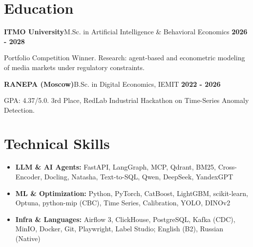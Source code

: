 \documentclass[a4paper,10pt]{article}
\newcommand{\sep}{\hspace{0.45em}\textbar\hspace{0.45em}}
\begin{document}
\section{Education}
\noindent\textbf{ITMO University}\sep M.Sc. in Artificial Intelligence \& Behavioral Economics \hfill \textbf{\color{muted}2026 - 2028}\par
\noindent Portfolio Competition Winner. Research: \mbox{agent-based} and econometric modeling of media markets under regulatory constraints.\par\vspace{3.0pt}
\noindent\textbf{RANEPA (Moscow)}\sep B.Sc. in Digital Economics, IEMIT \hfill \textbf{\color{muted}2022 - 2026}\par
\noindent GPA: 4.37/5.0. 3rd Place, RedLab Industrial Hackathon on \mbox{Time-Series} Anomaly Detection.

\section{Technical Skills}
{\fontsize{8.35pt}{10.1pt}\selectfont
\begin{itemize}[itemsep=1.9pt, topsep=0.7pt]
  \item \textbf{LLM \& AI Agents:} FastAPI, \mbox{LangGraph}, MCP, Qdrant, BM25, \mbox{Cross-Encoder}, Docling, Natasha, \mbox{Text-to-SQL}, Qwen, DeepSeek, YandexGPT
  \item \textbf{ML \& Optimization:} Python, PyTorch, CatBoost, LightGBM, \mbox{scikit-learn}, Optuna, \mbox{python-mip} (CBC), Time Series, Calibration, YOLO, DINOv2
  \item \textbf{Infra \& Languages:} Airflow 3, ClickHouse, PostgreSQL, Kafka (CDC), MinIO, Docker, Git, Playwright, Label Studio; English (B2), Russian (Native)
\end{itemize}
}
\end{document}
